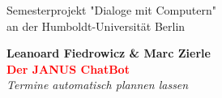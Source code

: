 \begin{titlepage}
	\raggedleft

	\vspace*{\baselineskip}

	{\Large Semesterprojekt "Dialoge mit Computern"\\an der Humboldt-Universität Berlin}

	\vspace*{0.167\textheight}

	\textbf{\LARGE Leanoard Fiedrowicz \& Marc Zierle}\\[\baselineskip]

	{\textcolor{Red}{\textbf{\Huge Der JANUS ChatBot}}}\\[\baselineskip]

	{\Large \textit{Termine automatisch plannen lassen}}

	\vfill


	\vspace*{3\baselineskip}
\end{titlepage}
